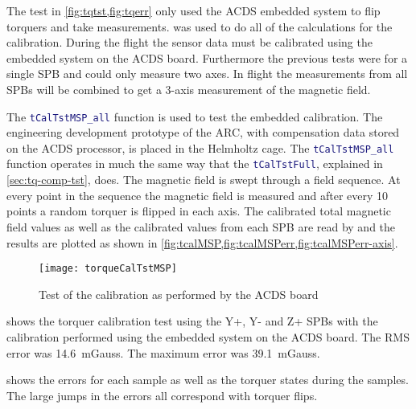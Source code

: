 The test in \cref{fig:tqtst,fig:tqerr} only used the \ac{ACDS} embedded system to flip torquers and take measurements. \matlab was used to do all of the calculations for the calibration. During the flight the sensor data must be calibrated using the embedded system on the \ac{ACDS} board. Furthermore the previous tests were for a single \ac{SPB} and could only measure two axes. In flight the measurements from all \acp{SPB} will be combined to get a 3-axis measurement of the magnetic field.

The \lstinline[style=code,language=Matlab]$tCalTstMSP_all$ function is used to test the embedded calibration. The engineering development prototype of the \ac{ARC}, with compensation data stored on the \ac{ACDS} processor, is placed in the Helmholtz cage. The \lstinline[style=code,language=Matlab]$tCalTstMSP_all$ function operates in much the same way that the \lstinline[style=code,language=Matlab]$tCalTstFull$, explained in \cref{sec:tq-comp-tst}, does. The magnetic field is swept through a field sequence. At every point in the sequence the magnetic field is measured and after every 10 points a random torquer is flipped in each axis. The calibrated total magnetic field values as well as the calibrated values from each \ac{SPB} are read by \matlab and the results are plotted as shown in \cref{fig:tcalMSP,fig:tcalMSPerr,fig:tcalMSPerr-axis}.

\begin{figure}[!ht]
    \centering
    \texttt{[image: torqueCalTstMSP]}
    \caption{Test of the calibration as performed by the \ac{ACDS} board}
    \label{fig:tcalMSP}
\end{figure}

 shows the torquer calibration test using the Y+, Y- and Z+ \acp{SPB} with the calibration performed using the embedded system on the \ac{ACDS} board. The RMS error was 14.6~mGauss. The maximum error was 39.1~mGauss.


 shows the errors for each sample as well as the torquer states during the samples. The large jumps in the errors all correspond with torquer flips.

